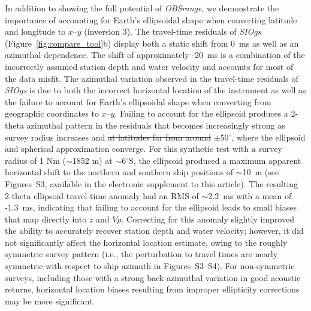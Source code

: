 \documentclass[10pt,titlepage]{article}
\providecommand{\DIFaddtex}[1]{{\protect\color{blue}\uwave{#1}}} %
\providecommand{\DIFdeltex}[1]{{\protect\color{red}\sout{#1}}}                      %
\providecommand{\DIFaddbegin}{} %
\providecommand{\DIFaddend}{} %
\providecommand{\DIFdelbegin}{} %
\providecommand{\DIFdelend}{} %
\providecommand{\DIFadd}[1]{\texorpdfstring{\DIFaddtex{#1}}{#1}} %
\providecommand{\DIFdel}[1]{\texorpdfstring{\DIFdeltex{#1}}{}} %
\begin{document}
In addition to showing the full potential of \textit{OBSrange}, we demonstrate the importance of accounting for Earth's ellipsoidal shape when converting latitude and longitude to $x$--$y$ (inversion 3). The travel-time residuals of \textit{SIOgs} (Figure~\ref{fig:compare_tool}b) display both a static shift from 0~ms as well as an azimuthal dependence. The shift of approximately -20~ms is a combination of the incorrectly assumed station depth and water velocity and accounts for most of the data misfit. The azimuthal variation observed in the travel-time residuals of \textit{SIOgs} is due to both the incorrect horizontal location of the instrument as well as the failure to account for Earth's ellipsoidal shape when converting from geographic coordinates to $x$--$y$. Failing to account for the ellipsoid produces a 2-theta azimuthal pattern in the residuals that becomes increasingly strong as survey radius increases and \DIFdelbegin \DIFdel{at latitudes far from around }\DIFdelend \DIFaddbegin \DIFadd{as latitudes deviate from approximately }\DIFaddend $\pm$50$^{\circ}$, where the ellipsoid and spherical approximation converge. For this synthetic test with a survey radius of 1 Nm ($\sim$1852 m) at $\sim$6$^{\circ}$S, the ellipsoid produced a maximum apparent horizontal shift to the northern and southern ship positions of $\sim$10~m (see Figures~S3, available in the electronic supplement to this article). The resulting 2-theta ellipsoid travel-time anomaly had an RMS of $\sim$2.2~ms with a mean of -1.3~ms, indicating that failing to account for the ellipsoid leads to small biases that map directly into $z$ and $Vp$. Correcting for this anomaly slightly improved the ability to accurately recover station depth and water velocity; however, it did not significantly affect the horizontal location estimate, owing to the roughly symmetric survey pattern (i.e., the perturbation to travel times are nearly symmetric with respect to ship azimuth in Figures~S3--S4). For non-symmetric surveys, including those with a strong back-azimuthal variation in good acoustic returns, horizontal location biases resulting from improper ellipticity corrections may be more significant.
\end{document}
